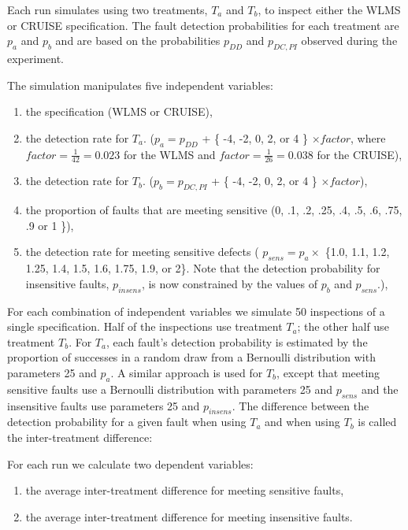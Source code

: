 Each run simulates using two treatments, $T_a$ and $T_b$,
to inspect either the WLMS or CRUISE specification. 
The fault detection probabilities for each treatment 
are $p_a$ and $p_b$ and are based on the probabilities
$p_{DD}$ and $p_{DC,PI}$ observed during the experiment.   

The simulation manipulates five independent variables:

\begin{enumerate}

\item the specification (WLMS or CRUISE),

\item the detection rate for $T_a$. ($p_a = p_{DD}$ + \{ -4, -2, 0, 2, or 4 \}
$\times factor$, where $factor = \frac{1}{42} = 0.023 $ for the WLMS and 
$factor = \frac{1}{26} = 0.038$ for the CRUISE),

\item the detection rate for $T_b$. ($p_b = p_{DC,PI}$ + \{ -4, -2, 0, 2, or 4 \} 
$\times factor$), 

\item the proportion of faults that are meeting sensitive (0, .1, .2, .25, .4,
.5, .6, .75, .9 or 1 \}),

\item the detection rate for meeting sensitive defects ( $p_{sens} = p_a 
\times $ \{1.0, 1.1, 1.2, 1.25, 1.4, 1.5, 1.6, 1.75, 1.9, or 2\}. Note that 
the detection
probability for insensitive faults, $p_{insens}$, is now constrained by the 
values of $p_b$ and $p_{sens}$.),

\end{enumerate}

For each combination of independent variables we simulate 50 inspections of 
a single specification. Half of the inspections use treatment $T_a$; 
the other half use treatment $T_b$. 
For $T_a$, each fault's detection probability is estimated by 
the proportion of successes in a random draw from a Bernoulli 
distribution with parameters 25 and $p_a$. A similar approach is 
used for $T_b$, except that meeting sensitive faults 
use a Bernoulli distribution with parameters 25 and $p_{sens}$
and the insensitive faults use parameters  25 and $p_{insens}$.
The difference between the detection probability for a given fault
when using $T_a$ and when using $T_b$ is called the inter-treatment 
difference:

For each run we calculate two dependent variables:

\begin{enumerate}

\item the average inter-treatment difference for meeting sensitive faults, 
\item the average inter-treatment difference for meeting insensitive faults.

\end{enumerate}


